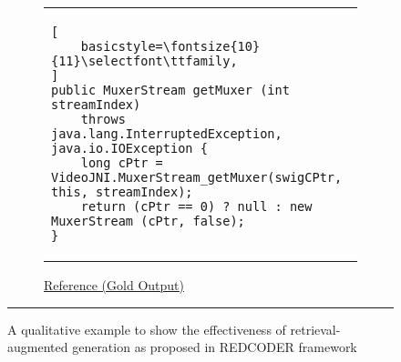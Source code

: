 \documentclass[11pt]{article}
\begin{document}
\begin{figure*}[t]
\begin{subfigure}{\textwidth}
\end{subfigure}
\vspace{5mm}
\begin{subfigure}{\textwidth}
\lstset{escapechar=@,style=CustomJava}
\captionsetup{font=large}
\caption{\underline{Reference (Gold Output)}}
\begin{tabular}{l}
\lstset{escapechar=@,style=CustomJava}
\begin{lstlisting}[
    basicstyle=\fontsize{10}{11}\selectfont\ttfamily,
]
public MuxerStream getMuxer (int streamIndex) 
    throws java.lang.InterruptedException, java.io.IOException {
    long cPtr = VideoJNI.MuxerStream_getMuxer(swigCPtr, this, streamIndex);
    return (cPtr == 0) ? null : new MuxerStream (cPtr, false);
}
\end{lstlisting}
\end{tabular}
\end{subfigure}
\rule{\linewidth}{0.9pt}
\caption{
A qualitative example to show the effectiveness of retrieval-augmented generation as proposed in REDCODER framework
}
\label{qual_example1}
\end{figure*}

 


 
\end{document}
